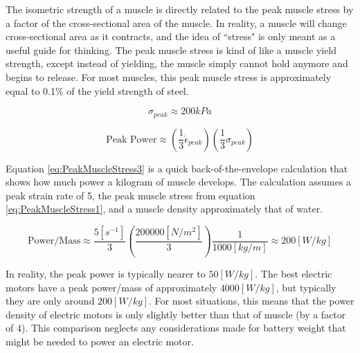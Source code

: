 The isometric strength of a muscle is directly related to the peak muscle stress by a factor of the cross-sectional area of the muscle. In reality, a muscle will change cross-sectional area as it contracts, and the idea of ``stress" is only meant as a useful guide for thinking. The peak muscle stress is kind of like a muscle yield strength, except instead of yielding, the muscle simply cannot hold anymore and begins to release. For most muscles, this peak muscle stress is approximately equal to 0.1\% of the yield strength of steel. 

\begin{equation}
\sigma_{peak} \approx 200 kPa
\label{eq:PeakMuscleStress1}
\end{equation}

\begin{equation}
\mbox{Peak Power} \approx \left(\frac{1}{3} \dot{\epsilon}_{peak}\right)\left(\frac{1}{3} \sigma_{peak}\right)
\label{eq:PeakMuscleStress2}
\end{equation}

Equation \ref{eq:PeakMuscleStress3} is a quick back-of-the-envelope calculation that shows how much power a kilogram of muscle develops. The calculation assumes a peak strain rate of 5, the peak muscle stress from equation \ref{eq:PeakMuscleStress1}, and a muscle density approximately that of water.

\begin{equation}
\mbox{Power/Mass} \approx \frac{5[s^{-1}]}{3}\left(\frac{200000[N/m^2]}{3}\right)\frac{1}{1000[kg/m]} \approx 200 [W/kg]
\label{eq:PeakMuscleStress3}
\end{equation}

In reality, the peak power is typically nearer to $50[W/kg]$. The best electric motors have a peak power/mass of approximately $4000[W/kg]$, but typically they are only around $200[W/kg]$. For most situations, this means that the power density of electric motors is only slightly better than that of muscle (by a factor of 4). This comparison neglects any considerations made for battery weight that might be needed to power an electric motor. 

